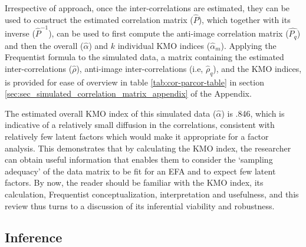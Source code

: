\documentclass[
  10pt,
  a4paper,
  twoside]{article}
\begin{document}
Irrespective of approach, once the inter-correlations are estimated, they can be used to construct the estimated correlation matrix (\(\hat{P}\)), which together with its inverse (\(\hat{P}^{-1}\)), can be used to first compute the anti-image correlation matrix (\(\hat{P_q}\)) and then the overall (\(\hat{\alpha}\)) and \(k\) individual KMO indices (\(\hat{\alpha}_m\)). Applying the Frequentist formula to the simulated data, a matrix containing the estimated inter-correlations (\(\hat{\rho}\)), anti-image inter-correlations (i.e, \(\hat{\rho}_q\)), and the KMO indices, is provided for ease of overview in table \ref{tab:cor-parcor-table} in section \ref{sec:sec_simulated_correlation_matrix_appendix} of the Appendix.

The estimated overall KMO index of this simulated data (\(\hat{\alpha}\)) is .846, which is indicative of a relatively small diffusion in the correlations, consistent with relatively few latent factors which would make it appropriate for a factor analysis. This demonstrates that by calculating the KMO index, the researcher can obtain useful information that enables them to consider the `sampling adequacy' of the data matrix to be fit for an EFA and to expect few latent factors. By now, the reader should be familiar with the KMO index, its calculation, Frequentist conceptualization, interpretation and usefulness, and this review thus turns to a discussion of its inferential viability and robustness.

\subsection{Inference}\label{sec:sec_kmo_inference}
\end{document}
